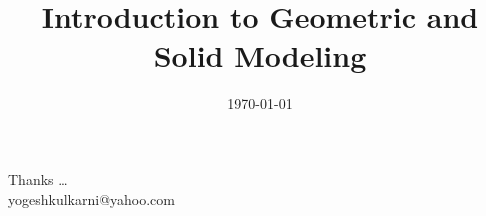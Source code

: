 \documentclass[t,pdf]{beamer}
\title[Geometric \& Solid Modeling \hspace{2cm} \insertframenumber/\inserttotalframenumber]{Introduction to Geometric and Solid Modeling}
\subtitle[]{}
\date[]{\today}
\begin{document}
\begin{frame}
\titlepage
\end{frame}



\begin{frame}[c]{}
Thanks \ldots \\
\vspace{5mm}
yogeshkulkarni@yahoo.com
\end{frame}
\end{document}

